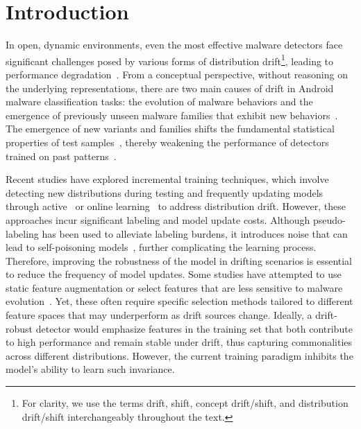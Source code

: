 \section{Introduction}
In open, dynamic environments, even the most effective malware detectors face significant challenges posed by various forms of distribution drift{}\footnote{For clarity, we use the terms drift, shift, concept drift/shift, and distribution drift/shift interchangeably throughout the text.}, leading to performance degradation~\cite{transcending, cade}. From a conceptual perspective, without reasoning on the underlying representations, there are two main causes of drift in Android malware classification tasks: the evolution of malware behaviors and the emergence of previously unseen malware families that exhibit new behaviors~\cite{pei2024exploiting}. The emergence of new variants and families shifts the fundamental statistical properties of test samples~\cite{tesseract, overkill, transcending, Drift_forensice}, thereby weakening the performance of detectors trained on past patterns~\cite{malware_evolution_update}.

Recent studies have explored incremental training techniques, which involve detecting new distributions during testing and frequently updating models through active~\cite{tesseract, continuous} or online learning~\cite{droidevolver, online_mal, labelless} to address distribution drift. However, these approaches incur significant labeling and model update costs. Although pseudo-labeling has been used to alleviate labeling burdens, it introduces noise that can lead to self-poisoning models~\cite{labelless, recda}, further complicating the learning process. Therefore, improving the robustness of the model in drifting scenarios is essential to reduce the frequency of model updates. Some studies have attempted to use static feature augmentation or select features that are less sensitive to malware evolution~\cite{scrr, apigraph, overkill}. Yet, these often require specific selection methods tailored to different feature spaces that may underperform as drift sources change. Ideally, a drift-robust detector would emphasize features in the training set that both contribute to high performance and remain stable under drift, thus capturing commonalities across different distributions. However, the current training paradigm inhibits the model's ability to learn such invariance.

